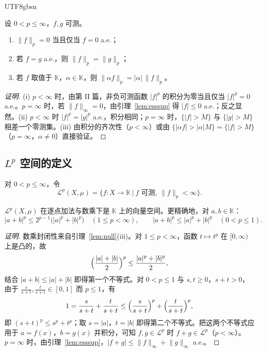 \documentclass[11pt]{article}
\newcommand{\K}{\mathbb{K}}
\newcommand{\norm}[1]{\lVert #1\rVert}
\begin{document}
\begin{CJK*}{UTF8}{gbsn}
\begin{lemma}\label{lem:null}
设 $0<p\le\infty$，$f,g$ 可测。
\begin{enumerate}
\item $\norm{f}_{p}=0$ 当且仅当 $f=0$ a.e.；
\item 若 $f=g$ a.e.，则 $\norm{f}_{p}=\norm{g}_{p}$；
\item 若 $f$ 取值于 $\K$，$\alpha\in\K$，则 $\norm{\alpha f}_{p}=|\alpha|\,\norm{f}_{p}$。
\end{enumerate}
\end{lemma}

\begin{proof}[证明]
(i) $p<\infty$ 时，由第 II 篇，非负可测函数 $|f|^{p}$ 的积分为零当且仅当 $|f|^{p}=0$ a.e.。$p=\infty$ 时，若 $\norm{f}_{\infty}=0$，由引理~\ref{lem:esssup} 得 $|f|\le0$ a.e.；反之显然。(ii) $p<\infty$ 时 $|f|^{p}=|g|^{p}$ a.e.，积分相同；$p=\infty$ 时，$\{|f|>M\}$ 与 $\{|g|>M\}$ 相差一个零测集。(iii) 由积分的齐次性（$p<\infty$）或由 $\{|\alpha f|>|\alpha|M\}=\{|f|>M\}$（$p=\infty$，$\alpha\ne0$）直接验证。
\end{proof}

\subsection{$L^{p}$ 空间的定义}

\begin{definition}\label{def:calLp}
对 $0<p\le\infty$，令
\[
\mathcal{L}^{p}(X,\mu)=\bigl\{f:X\to\K\ \big|\ f\text{ 可测},\ \norm{f}_{p}<\infty\bigr\}.
\]
\end{definition}

\begin{proposition}\label{prop:vector}
$\mathcal{L}^{p}(X,\mu)$ 在逐点加法与数乘下是 $\K$ 上的向量空间。更精确地，对 $a,b\in\K$：
\[
|a+b|^{p}\le 2^{p-1}\bigl(|a|^{p}+|b|^{p}\bigr)\quad(1\le p<\infty),\qquad
|a+b|^{p}\le |a|^{p}+|b|^{p}\quad(0<p\le1).
\]
\end{proposition}

\begin{proof}[证明]
数乘封闭性来自引理~\ref{lem:null}(iii)。对 $1\le p<\infty$，函数 $t\mapsto t^{p}$ 在 $[0,\infty)$ 上是凸的，故
\[
\Bigl(\frac{|a|+|b|}{2}\Bigr)^{p}\le\frac{|a|^{p}+|b|^{p}}{2},
\]
结合 $|a+b|\le|a|+|b|$ 即得第一个不等式。对 $0<p\le1$ 与 $s,t\ge0$，$s+t>0$，由于 $\frac{s}{s+t},\frac{t}{s+t}\in[0,1]$ 而 $p\le1$，有
\[
1=\frac{s}{s+t}+\frac{t}{s+t}\le\Bigl(\frac{s}{s+t}\Bigr)^{p}+\Bigl(\frac{t}{s+t}\Bigr)^{p},
\]
即 $(s+t)^{p}\le s^{p}+t^{p}$；取 $s=|a|$，$t=|b|$ 即得第二个不等式。把这两个不等式应用于 $a=f(x)$，$b=g(x)$ 并积分，可知 $f,g\in\mathcal{L}^{p}$ 时 $f+g\in\mathcal{L}^{p}$（$p<\infty$）。$p=\infty$ 时，由引理~\ref{lem:esssup}，$|f+g|\le\norm{f}_{\infty}+\norm{g}_{\infty}$ a.e.。
\end{proof}


\end{CJK*}
\end{document}
